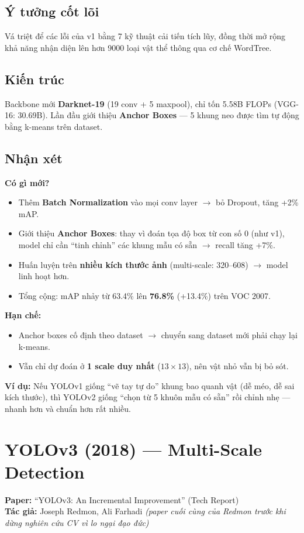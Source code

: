\documentclass[12pt,a4paper]{report}
\begin{document}
\subsection{Ý tưởng cốt lõi}
Vá triệt để các lỗi của v1 bằng 7 kỹ thuật cải tiến tích lũy, đồng thời mở rộng khả năng nhận diện lên hơn 9000 loại vật thể thông qua cơ chế WordTree.

\subsection{Kiến trúc}
Backbone mới \textbf{Darknet-19} (19 conv + 5 maxpool), chỉ tốn 5.58B FLOPs (VGG-16: 30.69B). Lần đầu giới thiệu \textbf{Anchor Boxes} --- 5 khung neo được tìm tự động bằng k-means trên dataset.

\subsection{Nhận xét}

\textbf{Có gì mới?}
\begin{itemize}
    \item Thêm \textbf{Batch Normalization} vào mọi conv layer $\rightarrow$ bỏ Dropout, tăng +2\% mAP.
    \item Giới thiệu \textbf{Anchor Boxes}: thay vì đoán tọa độ box từ con số 0 (như v1), model chỉ cần ``tinh chỉnh'' các khung mẫu có sẵn $\rightarrow$ recall tăng +7\%.
    \item Huấn luyện trên \textbf{nhiều kích thước ảnh} (multi-scale: 320--608) $\rightarrow$ model linh hoạt hơn.
    \item Tổng cộng: mAP nhảy từ 63.4\% lên \textbf{76.8\%} (+13.4\%) trên VOC 2007.
\end{itemize}

\textbf{Hạn chế:}
\begin{itemize}
    \item Anchor boxes cố định theo dataset $\rightarrow$ chuyển sang dataset mới phải chạy lại k-means.
    \item Vẫn chỉ dự đoán ở \textbf{1 scale duy nhất} ($13\times13$), nên vật nhỏ vẫn bị bỏ sót.
\end{itemize}

\textbf{Ví dụ:} Nếu YOLOv1 giống ``vẽ tay tự do'' khung bao quanh vật (dễ méo, dễ sai kích thước), thì YOLOv2 giống ``chọn từ 5 khuôn mẫu có sẵn'' rồi chỉnh nhẹ --- nhanh hơn và chuẩn hơn rất nhiều.

\section{YOLOv3 (2018) --- Multi-Scale Detection}
\textbf{Paper:} ``YOLOv3: An Incremental Improvement'' (Tech Report) \cite{yolov3}\\
\textbf{Tác giả:} Joseph Redmon, Ali Farhadi \textit{(paper cuối cùng của Redmon trước khi dừng nghiên cứu CV vì lo ngại đạo đức)}
\end{document}
